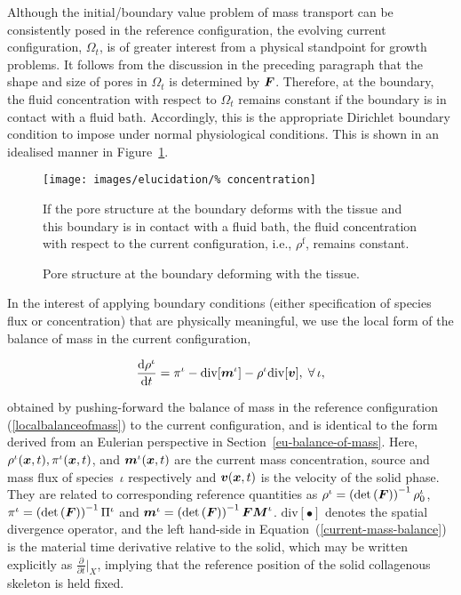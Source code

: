 Although the initial/boundary value problem of mass transport can be
consistently posed in the reference configuration, the evolving
current configuration, $\Omega_t$, is of greater interest from a
physical standpoint for growth problems. It follows from the
discussion in the preceding paragraph that the shape and size of pores
in $\Omega_t$ is determined by $\mbox{\boldmath$ F$}$. Therefore, at the boundary, the
fluid concentration with respect to $\Omega_t$ remains constant if the
boundary is in contact with a fluid bath.  Accordingly, this is the
appropriate Dirichlet boundary condition to impose under normal
physiological conditions. This is shown in an idealised manner in
Figure~\ref{current-conc-fluid-bc}.

\begin{figure}
  \begin{center}
    \texttt{[image: images/elucidation/\%
      concentration]}
    \caption{Pore structure at the boundary deforming with the tissue.} 
    \label{current-conc-fluid-bc}
  \end{center}
      {If the pore structure at the boundary deforms with the tissue
        and this boundary is in contact with a fluid bath, the fluid
        concentration with respect to the current configuration, i.e.,
        $\rho^\mathrm{f}$, remains constant.}
\end{figure}

In the interest of applying boundary conditions (either specification
of species flux or concentration) that are physically meaningful, we
use the local form of the balance of mass in the current
configuration,

\begin{equation}
  \frac{\mathrm{d}\rho^\iota}{\mathrm{d}t} = \pi^\iota-
  \mathrm{div}[\mbox{\boldmath$ m$}^\iota] - \rho^\iota
  \mathrm{div}[\mbox{\boldmath$ v$}],\;\forall\,\iota,
  \label{current-mass-balance}
\end{equation}

\noindent obtained by pushing-forward the balance of mass in the
reference configuration (\ref{localbalanceofmass}) to the current
configuration, and is identical to the form derived from an Eulerian
perspective in Section~\ref{eu-balance-of-mass}. Here,
$\rho^\iota(\mbox{\boldmath$ x$},t),\pi^\iota(\mbox{\boldmath$ x$},t)$, and $\mbox{\boldmath$ m$}^\iota(\mbox{\boldmath$ x$},t)$ are the
current mass concentration, source and mass flux of species~$\iota$
respectively and $\mbox{\boldmath$ v$}(\mbox{\boldmath$ x$},t)$ is the velocity of the solid phase. They
are related to corresponding reference quantities as \mbox{$\rho^\iota
  = \left(\mathrm{det} \left(\mbox{\boldmath$ F$}\right) \right)^{-1} \rho_0^\iota$},
\mbox{$\pi^\iota = \left(\mathrm{det} \left(\mbox{\boldmath$ F$}\right) \right)^{-1}
  \Pi^\iota$} and \mbox{$\mbox{\boldmath$ m$}^\iota = \left(\mathrm{det}
  \left(\mbox{\boldmath$ F$}\right) \right)^{-1} \mbox{\boldmath$ F$}
  \mbox{\boldmath$ M$}^\iota$}. $\mathrm{div}[\bullet]$ denotes the spatial divergence
operator, and the left hand-side in
Equation~(\ref{current-mass-balance}) is the material time derivative
relative to the solid, which may be written explicitly as
$\frac{\partial}{\partial t}\vert_X$, implying that the reference
position of the solid collagenous skeleton is held fixed.

